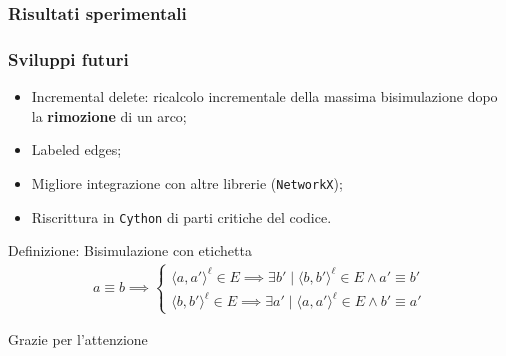 \documentclass{beamer}
\begin{document}
\begin{frame}\frametitle{Risultati sperimentali}
\end{frame}

\begin{frame}\frametitle{Sviluppi futuri}
    \begin{itemize}
        \item Incremental delete: ricalcolo incrementale della massima bisimulazione dopo la \textbf{rimozione} di un arco;
        \item Labeled edges;
        \item Migliore integrazione con altre librerie (\texttt{NetworkX});
        \item Riscrittura in \texttt{Cython} di parti critiche del codice.
    \end{itemize}


    \begin{block}{Definizione: Bisimulazione con etichetta}
        \begin{gather*}
            a \equiv b \implies
            \begin{cases}
                \langle a, a' \rangle^\ell \in E \implies \exists b' \mid \langle b, b' \rangle^\ell \in E \land a' \equiv b'\\
                \langle b, b' \rangle^\ell \in E \implies \exists a' \mid \langle a, a' \rangle^\ell \in E \land b' \equiv a'
            \end{cases}
        \end{gather*}
    \end{block}
\end{frame}

\begin{frame}
    Grazie per l'attenzione
\end{frame}
\end{document}
